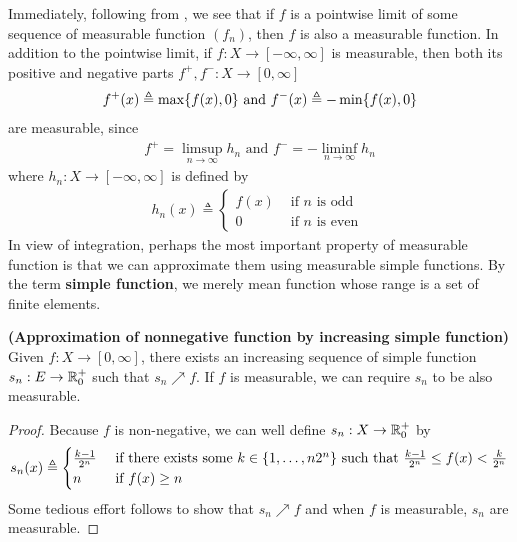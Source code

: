 \documentclass{report}
\begin{document}
\begin{mdframed}
Immediately, following from , we see that if $f$ is a pointwise limit of some sequence of measurable function $(f_n)$, then $f$ is also a measurable function. In addition to the pointwise limit, if $f:X\rightarrow [-\infty,\infty]$ is measurable, then both its positive and negative parts  $f^+,f^-:X\rightarrow [0,\infty]$ 
\begin{align*}
f^+(x)\triangleq \max \{ f(x),0 \}\text{ and }f^-(x)\triangleq  - \min  \{ f(x),0 \}
\end{align*}
are measurable, since 
\begin{align*}
f^+=\limsup_{n\to\infty} h_n\text{ and }f^-=-\liminf_{n\to\infty} h_n
\end{align*}
where $h_n:X\rightarrow [-\infty,\infty]$ is defined by 
\begin{align*}
h_n(x)\triangleq \begin{cases}
  f(x)& \text{ if $n$ is odd }\\
  0& \text{ if $n$ is even }
\end{cases}
\end{align*}
In view of integration, perhaps the most important property of measurable function is that we can approximate them using measurable simple functions. By the term \textbf{simple function}, we merely mean function whose range is a set of finite elements. 
\end{mdframed}
\begin{theorem}
\label{Approximation of nonnegative function by increasing simple function}
\textbf{(Approximation of nonnegative function by increasing simple function)} Given $f:X\rightarrow [0,\infty]$, there exists an increasing sequence of simple function $s_n:E\rightarrow \mathbb{R}_0^+$ such that $s_n \nearrow f$. If $f$ is measurable, we can require $s_n$ to be also measurable.
\end{theorem}
\begin{proof}
Because  $f$ is non-negative, we can well define $s_n:X\rightarrow \mathbb{R}_0^+$ by 
\begin{align*}
s_n(x)\triangleq \begin{cases}
  \frac{k-1}{2^n}& \text{ if there exists some $k\in \{ 1,\dots ,n2^n \}$ such that }\frac{k-1}{2^n}\leq f(x)< \frac{k}{2^n}\\
  n& \text{ if $f(x)\geq n$ }
\end{cases}
\end{align*}
Some tedious effort follows to show that $s_n\nearrow f$ and when  $f$ is measurable, $s_n$ are measurable. 
\end{proof}
\end{document}
